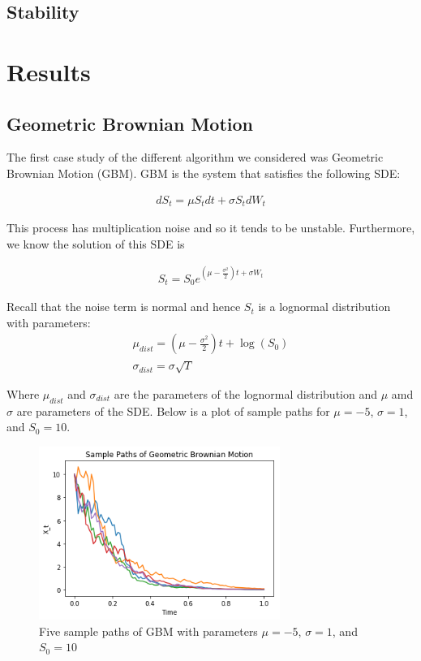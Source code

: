 \documentclass[notitlepage,pra,10pt,aps]{revtex4-2}
\begin{document}
\subsection{Stability}

\section{Results}
  \subsection{Geometric Brownian Motion}
  The first case study of the different algorithm we considered was Geometric Brownian Motion (GBM). GBM is the system that satisfies the following SDE:

  \begin{gather*}
    d S_t = \mu S_t dt + \sigma S_t d W_t
  \end{gather*}

  This process has multiplication noise and so it tends to be unstable. Furthermore, we know the solution of this SDE is

  \begin{gather*}
    S_t = S_0 e^{(\mu - \frac{\sigma^2}{2})t + \sigma W_t}
  \end{gather*}

  Recall that the noise term is normal and hence $S_t$ is a lognormal distribution with parameters:
  \begin{gather*}
    \mu_{dist} = (\mu - \frac{\sigma^2}{2})t + \log(S_0) \\
    \sigma_{dist} = \sigma \sqrt{T}
  \end{gather*}

  Where $\mu_{dist}$ and $\sigma_{dist}$ are the parameters of the lognormal distribution and $\mu$ amd $\sigma$ are parameters of the SDE. Below is a plot of sample paths for $\mu = -5$, $\sigma = 1$, and $S_0 = 10$.

  \begin{figure}[H]
    \centering
      \includegraphics[width=0.7\textwidth]{sample_paths_gbm.png}
    \caption{Five sample paths of GBM with parameters $\mu = -5$, $\sigma = 1$, and $S_0 = 10$}
  \end{figure}
\end{document}
